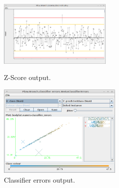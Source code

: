 \documentclass[a4paper]{book}
\begin{document}
\begin{figure}[ht]
  \begin{minipage}[t]{0.5\linewidth}
    \centering
    \includegraphics[width=5.5cm]{images/zscore-output1.png}
    \caption{Z-Score output.}
    \label{zscore-output1}
  \end{minipage}
  \hspace{0.5cm}
  \begin{minipage}[t]{0.5\linewidth}
    \centering
    \includegraphics[width=6.0cm]{images/zscore-output2.png}
    \caption{Classifier errors output.}
    \label{zscore-output2}
  \end{minipage}
\end{figure}


\end{document}
